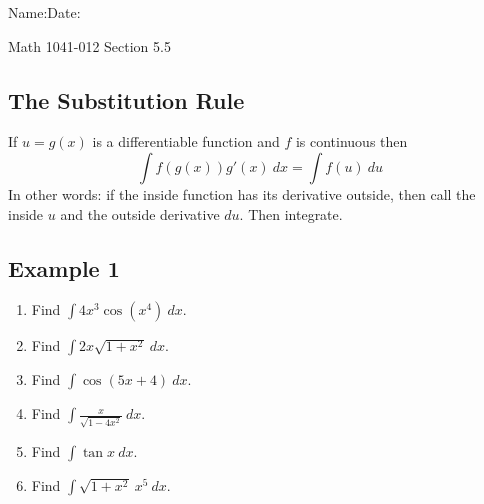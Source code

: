 \documentclass[10pt]{book}
\theoremstyle{definition}
\begin{document}
\begin{flushleft}
Name:\underline{\hspace{13cm}}Date:\underline{\hspace{2cm}}
\end{flushleft}
\begin{center}
{\Large Math 1041-012 \hspace{0.5cm} Section 5.5}
\end{center}

\begin{tcolorbox}
\subsection*{The Substitution Rule}
If $u=g(x)$ is a differentiable function and $f$ is continuous then
\[
\int f(g(x))g'(x)\ dx =\int f(u)\ du
\]
In other words: if the inside function has its derivative outside, then call the inside $u$ and the outside derivative $du$. Then integrate.
\end{tcolorbox}
\subsection*{Example 1} 
\begin{enumerate}[label=(\alph*)]
    \item Find $\displaystyle\int 4x^3\cos (x^4)\ dx$.\vspace{4cm}
    \item Find $\displaystyle\int 2x\sqrt{1+x^2}\ dx$.\vspace{4cm}
    \item Find $\displaystyle\int \cos(5x+4)\ dx$.\vspace{4cm}
    \item Find $\displaystyle\int \frac{x}{\sqrt{1-4x^2}}\ dx$.\vspace{5cm}
    \item Find $\displaystyle\int \tan x \ dx$.\vspace{5cm}
     \item Find $\displaystyle\int \sqrt{1+x^2}\ x^5\ dx$.\vspace{5cm}
\end{enumerate}
\end{document}
